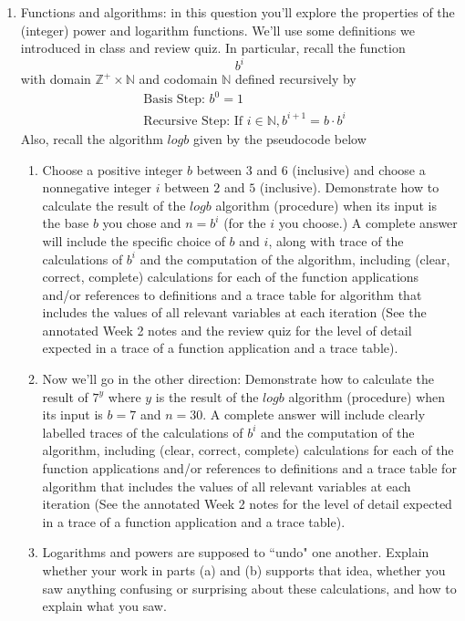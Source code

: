 \begin{enumerate}[labelindent=0pt, leftmargin=0pt]
\item Functions and algorithms: in this question you'll explore the properties of the (integer) power and logarithm
functions. We'll use some definitions we introduced in class and review quiz.
In particular, recall the function
$$b^i$$ with domain $\mathbb{Z}^+ \times \mathbb{N}$ and codomain $\mathbb{N}$ defined recursively by
\begin{align*}    
&\textrm{Basis Step: } b^0 = 1 \\
&\textrm{Recursive Step: } \textrm{If } i \in \mathbb{N}, b^{i+1} = b \cdot b^i
\end{align*}
Also, recall the algorithm $logb$ given by the pseudocode below



    \begin{enumerate}
    \item Choose a positive integer $b$ between $3$ and $6$ (inclusive) and choose a 
    nonnegative integer $i$ between $2$ and $5$ (inclusive). Demonstrate how to calculate 
    the result of the $logb$ algorithm (procedure) when its input is the base $b$ you chose and
    $n = b^i$ (for the $i$ you choose.) 
    A complete answer will include the specific choice of $b$ and $i$, along with 
    trace of the calculations of $b^i$ and the computation of the algorithm, including 
    (clear, correct, complete) calculations for each of the function applications 
    and/or references to definitions and a trace table for algorithm that includes the values of all relevant 
    variables at each iteration (See the annotated Week 2 notes and the review quiz for the level of detail expected
    in a trace of a function application and a trace table).
    \item Now we'll go in the other direction: Demonstrate how to calculate the result of 
    $7^y$ where $y$ is the result of the $logb$ algorithm (procedure) when its input is $b=7$ and $n=30$.
    A complete answer will include clearly labelled 
    traces of the calculations of $b^i$ and the computation of the algorithm, including 
    (clear, correct, complete) calculations for each of the function applications 
    and/or references to definitions and a trace table for algorithm that includes the values of all relevant 
    variables at each iteration (See the annotated Week 2 notes for the level of detail expected
    in a trace of a function application and a trace table).    
    \item Logarithms and powers are supposed to ``undo" one another. Explain whether your work in parts (a) and (b)
    supports that idea,  whether you saw anything confusing or surprising about these calculations, and how to explain what you saw.
    \end{enumerate}


\end{enumerate}
